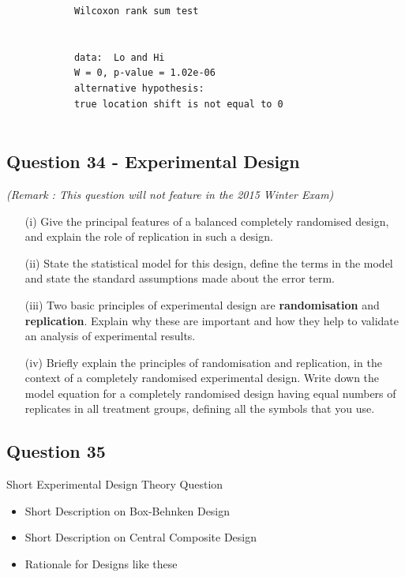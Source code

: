 \documentclass[a4paper,12pt]{article}
\begin{document}
\begin{itemize}
\begin{itemize}
\begin{framed}
\begin{verbatim}
			Wilcoxon rank sum test
			
			
			data:  Lo and Hi
			W = 0, p-value = 1.02e-06
			alternative hypothesis: 
			true location shift is not equal to 0
			
			\end{verbatim}
		\end{framed}
	\end{itemize}
	
\end{itemize} %

\subsection*{Question 34 - Experimental Design}
\textit{(Remark : This question will not feature in the 2015 Winter Exam)}
\begin{itemize}
	\item[(i)] Give the principal features of a  balanced completely randomised design, and
	explain the role of replication in such a design.  \item[(ii)] State the statistical model for
	this design, define the terms in the model and state the standard assumptions
	made about the error term.
\item[(iii)] Two basic principles of experimental design are \textbf{randomisation} and
\textbf{replication}. Explain why these are important and how they help to
validate an analysis of experimental results. 
	\item[(iv)] Briefly explain the principles of randomisation and replication, in the
	context of a completely randomised experimental design. Write down the model equation for a completely randomised design
	having equal numbers of replicates in all treatment groups, defining all
	the symbols that you use.
\end{itemize}

\subsection*{Question 35}
Short Experimental Design Theory Question
\begin{itemize}
	\item Short Description on Box-Behnken Design
	\item Short Description on Central Composite Design
	\item Rationale for Designs like these
\end{itemize}
\end{document}
